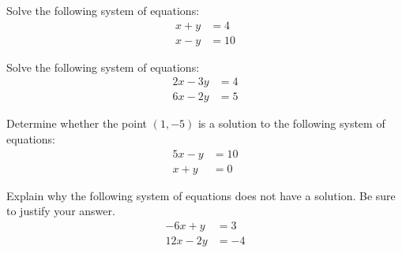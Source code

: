 \documentclass[12pt,letterpaper]{exam}
\begin{document}
\begin{questions}
\newpage
\question[5] Solve the following system of equations:
	\[
	\begin{aligned}
	x + y&= 4 \\
	x - y&= 10
	\end{aligned}
	\]





\newpage
\question[5] Solve the following system of equations: 
	\[
	\begin{aligned}
	2x - 3y&= 4 \\
	6x - 2y&= 5
	\end{aligned}
	\]





\newpage
\question[5] Determine whether the point $(1, -5)$ is a solution to the following system of equations:
	\[
	\begin{aligned}
	5x - y&= 10 \\
	x + y&= 0 
	\end{aligned}
	\]





\newpage
\question[5] Explain why the following system of equations does not have a solution. Be sure to justify your answer. 
	\[
	\begin{aligned}
	-6x + y&= 3 \\
	12x - 2y&= -4
	\end{aligned}
	\]


\end{questions}
\end{document}
